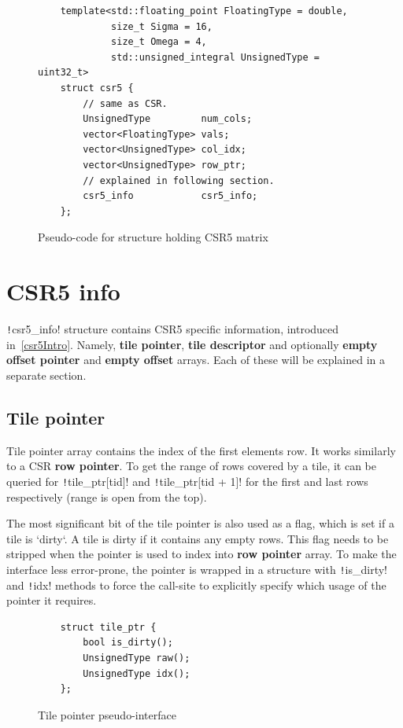 \documentclass[thesis=M,english]{FITthesis}[2019/12/23]
\newcommand{\csre}[1]{\texttt!#1!}
\begin{document}
\begin{figure}[htp]
    \begin{verbatim}
    template<std::floating_point FloatingType = double,
             size_t Sigma = 16,
             size_t Omega = 4,
             std::unsigned_integral UnsignedType = uint32_t>
    struct csr5 {
        // same as CSR.
        UnsignedType         num_cols;
        vector<FloatingType> vals;
        vector<UnsignedType> col_idx;
        vector<UnsignedType> row_ptr;
        // explained in following section.
        csr5_info            csr5_info;
    };
    \end{verbatim}
    \caption{Pseudo-code for structure holding CSR5 matrix}
\end{figure}

\section{CSR5 info}

\csre{csr5_info} structure contains CSR5 specific information, introduced in~\ref{csr5Intro}.
Namely, \textbf{tile pointer}, \textbf{tile descriptor} and optionally \textbf{empty offset pointer} and
\textbf{empty offset} arrays. Each of these will be explained in a separate section.

\subsection{Tile pointer}

Tile pointer array contains the index of the first elements row. It works similarly to a CSR
\textbf{row pointer}. To get the range of rows covered by a tile, it can be queried for \csre{tile_ptr[tid]}
and \csre{tile_ptr[tid + 1]} for the first and last rows respectively (range is open from the top).

The most significant bit of the tile pointer is also used as a flag, which is set if a tile is `dirty`.
A tile is dirty if it contains any empty rows. This flag needs to be stripped when the pointer is used to
index into \textbf{row pointer} array. To make the interface less error-prone, the pointer is wrapped
in a structure with \csre{is_dirty} and \csre{idx} methods to force the call-site to explicitly specify
which usage of the pointer it requires.

\begin{figure}[htp]
    \begin{verbatim}
    struct tile_ptr {
        bool is_dirty();
        UnsignedType raw(); 
        UnsignedType idx(); 
    };
    \end{verbatim}
    \caption{Tile pointer pseudo-interface}
\end{figure}
\end{document}
